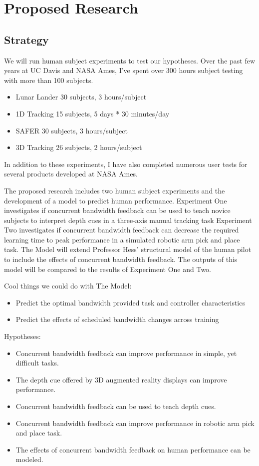 \documentclass[float=false, crop=false]{standalone}
\begin{document}
\section{Proposed Research}
\subsection{Strategy}
We will run human subject experiments to test our hypotheses.
Over the past few years at UC Davis and NASA Ames, I’ve spent over 300 hours subject testing with more than 100 subjects.

\begin{itemize}
\item Lunar Lander      30 subjects, 3 hours/subject
\item 1D Tracking       15 subjects, 5 days * 30 minutes/day
\item SAFER             30 subjects, 3 hours/subject
\item 3D Tracking       26 subjects, 2 hours/subject
\end{itemize}

In addition to these experiments, I have also completed numerous user tests for several products developed at NASA Ames.

The proposed research includes two human subject experiments and the development of a model to predict human performance.
Experiment One investigates if concurrent bandwidth feedback can be used to teach novice subjects to interpret depth cues in a three-axis manual tracking task
Experiment Two investigates if concurrent bandwidth feedback can decrease the required learning time to peak performance in a simulated robotic arm pick and place task.
The Model will extend Professor Hess’ structural model of the human pilot to include the effects of concurrent bandwidth feedback.
The outputs of this model will be compared to the results of Experiment One and Two.

Cool things we could do with The Model:
\begin{itemize}
\item Predict the optimal bandwidth provided task and controller characteristics
\item Predict the effects of scheduled bandwidth changes across training
\end{itemize}

Hypotheses:
\begin{itemize}
\item Concurrent bandwidth feedback can improve performance in simple, yet difficult tasks.
\item The depth cue offered by 3D augmented reality displays can improve performance.
\item Concurrent bandwidth feedback can be used to teach depth cues.
\item Concurrent bandwidth feedback can improve performance in robotic arm pick and place task.
\item The effects of concurrent bandwidth feedback on human performance can be modeled.
\end{itemize}
\end{document}
